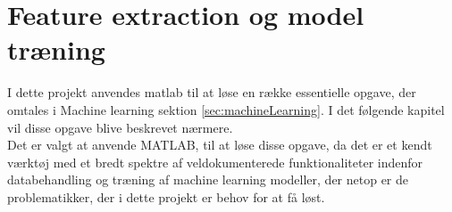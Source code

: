 \thispagestyle{fancy}
\chapter{Feature extraction og model træning}
\label{chp:matlabChapter}
I dette projekt anvendes matlab til at løse en række essentielle opgave, der omtales i Machine learning sektion \ref{sec:machineLearning}. I det følgende kapitel vil disse opgave blive beskrevet nærmere. \\
Det er valgt at anvende MATLAB, til at løse disse opgave, da det er et kendt værktøj med et bredt spektre af veldokumenterede funktionaliteter indenfor databehandling og træning af machine learning modeller, der netop er de problematikker, der i dette projekt er behov for at få løst.  


